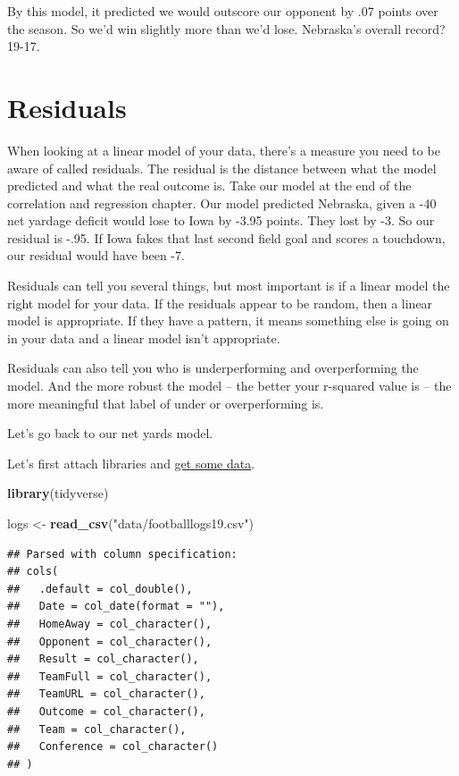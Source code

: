 \documentclass[
]{book}
\newenvironment{Shaded}{\begin{snugshade}}{\end{snugshade}}
\newcommand{\KeywordTok}[1]{\textcolor[rgb]{0.13,0.29,0.53}{\textbf{#1}}}
\newcommand{\NormalTok}[1]{#1}
\newcommand{\StringTok}[1]{\textcolor[rgb]{0.31,0.60,0.02}{#1}}
\begin{document}
By this model, it predicted we would outscore our opponent by .07 points over the season. So we'd win slightly more than we'd lose. Nebraska's overall record? 19-17.

\hypertarget{residuals}{%
\chapter{Residuals}\label{residuals}}

When looking at a linear model of your data, there's a measure you need to be aware of called residuals. The residual is the distance between what the model predicted and what the real outcome is. Take our model at the end of the correlation and regression chapter. Our model predicted Nebraska, given a -40 net yardage deficit would lose to Iowa by -3.95 points. They lost by -3. So our residual is -.95. If Iowa fakes that last second field goal and scores a touchdown, our residual would have been -7.

Residuals can tell you several things, but most important is if a linear model the right model for your data. If the residuals appear to be random, then a linear model is appropriate. If they have a pattern, it means something else is going on in your data and a linear model isn't appropriate.

Residuals can also tell you who is underperforming and overperforming the model. And the more robust the model -- the better your r-squared value is -- the more meaningful that label of under or overperforming is.

Let's go back to our net yards model.

Let's first attach libraries and \href{https://unl.box.com/s/2prgq48ctoxlukn6kmfjw0u1opda5s0m}{get some data}.

\begin{Shaded}
\begin{Highlighting}[]
\KeywordTok{library}\NormalTok{(tidyverse)}
\end{Highlighting}
\end{Shaded}

\begin{Shaded}
\begin{Highlighting}[]
\NormalTok{logs <-}\StringTok{ }\KeywordTok{read_csv}\NormalTok{(}\StringTok{"data/footballlogs19.csv"}\NormalTok{)}
\end{Highlighting}
\end{Shaded}

\begin{verbatim}
## Parsed with column specification:
## cols(
##   .default = col_double(),
##   Date = col_date(format = ""),
##   HomeAway = col_character(),
##   Opponent = col_character(),
##   Result = col_character(),
##   TeamFull = col_character(),
##   TeamURL = col_character(),
##   Outcome = col_character(),
##   Team = col_character(),
##   Conference = col_character()
## )
\end{verbatim}
\end{document}
